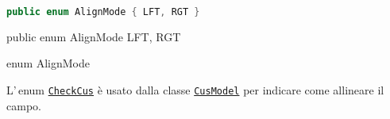 \ifesource
\begin{lstlisting}[language=java, 
caption=enum AlignMode, 
label=lst:AlignMode]
public enum AlignMode { LFT, RGT }
\end{lstlisting}
\else
\begin{elisting}
\begin{javacode}
public enum AlignMode { LFT, RGT }
\end{javacode}
\caption{enum AlignMode}\label{lst:AlignMode}
\end{elisting}
\fi
L'\,enum \hyperref[lst:CheckCus]{\texttt{CheckCus}} è usato dalla classe
\hyperref[lst:CusModel]{\texttt{CusModel}} per indicare come allineare il campo.


\vfill
